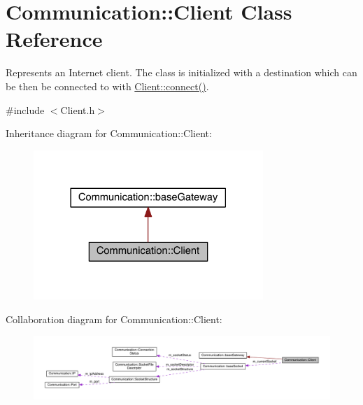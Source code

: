 \hypertarget{class_communication_1_1_client}{}\section{Communication\+:\+:Client Class Reference}
\label{class_communication_1_1_client}


Represents an Internet client. The class is initialized with a destination which can be then be connected to with \hyperlink{class_communication_1_1_client_a0fa54f72440e34d7659d6289ce4219d5}{Client\+::connect()}.  




{\ttfamily \#include $<$Client.\+h$>$}



Inheritance diagram for Communication\+:\+:Client\+:\nopagebreak
\begin{figure}[H]
\begin{center}
\leavevmode
\includegraphics[width=246pt]{class_communication_1_1_client__inherit__graph}
\end{center}
\end{figure}


Collaboration diagram for Communication\+:\+:Client\+:\nopagebreak
\begin{figure}[H]
\begin{center}
\leavevmode
\includegraphics[width=350pt]{class_communication_1_1_client__coll__graph}
\end{center}
\end{figure}
